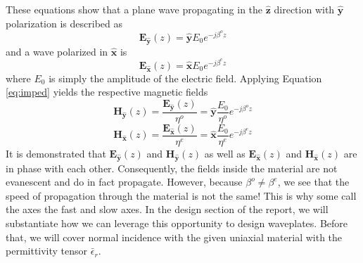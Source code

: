 \documentclass{optica-article}
\newcommand{\bv}[1]{\mathbf{#1}}
\begin{document}
These equations show that a plane wave propagating in the $\bv{\hat{z}}$ 
direction with $\bv{\hat{y}}$ polarization is described as
\begin{equation}
    \bv{E}_\bv{\hat{y}}(z) = \bv{\hat{y}}E_0 e^{-j\beta^o z}
\end{equation}
and a wave polarized in $\bv{\hat{x}}$ is 
\begin{equation}
  \bv{E}_\bv{\hat{x}}(z) = \bv{\hat{x}}E_0 e^{-j\beta^e z}
\end{equation}
where $E_0$ is simply the amplitude of the electric field. Applying Equation
\eqref{eq:imped} yields the respective magnetic fields \cite{Balanis-2012}
\begin{equation}
  \bv{H}_\bv{\hat{y}}(z) = \frac{\bv{E}_\bv{\hat{y}}(z)}{\eta^o}
  =\bv{\hat{y}}\frac{E_0}{\eta^o} e^{-j\beta^o z}
\end{equation}
\begin{equation}
  \bv{H}_\bv{\hat{x}}(z) = \frac{\bv{E}_\bv{\hat{x}}(z)}{\eta^e}
  =\bv{\hat{x}}\frac{E_0}{\eta^e} e^{-j\beta^e z}
\end{equation}
It is demonstrated that  $\bv{E}_\bv{\hat{y}}(z)$ and $\bv{H}_\bv{\hat{y}}(z)$
as well as $\bv{E}_\bv{\hat{x}}(z)$ and $\bv{H}_\bv{\hat{x}}(z)$
are in phase with each other. Consequently, the fields inside the material 
are not evanescent and do in fact propagate. However, because 
$\beta^o\neq\beta^e$, we see that the speed of propagation through the material 
is not the same! This is why some call the axes the fast and slow axes.
 In the design section of the report, we will substantiate how 
we can leverage this opportunity to design waveplates. Before that, we will
cover normal incidence with the given uniaxial material with the permittivity
tensor $\bar{\epsilon}_r$.

\end{document}
